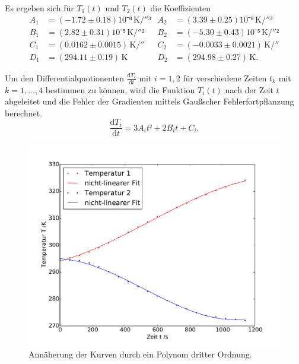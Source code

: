 Es ergeben sich für $T_1(t)$ und $T_2(t)$ die Koeffizienten 
\begin{align}
	A_1&=(-1.72\pm0.18)10⁻⁸\,\si{\kelvin\per{\second}³}  & A_2&=(3.39\pm0.25)10⁻⁸\,\si{\kelvin\per{\second}³}\\
	B_1&=(2.82\pm0.31)10⁻⁵\,\si{\kelvin\per{\second}²}  & B_2&=(-5.30\pm0.43)10⁻⁵\,\si{\kelvin\per{\second}²}\\
	C_1&=(0.0162\pm0.0015)\,\si{\kelvin\per{\second}}  & C_2&=(-0.0033\pm0.0021)\,\si{\kelvin\per{\second}}\\
	D_1&=(294.11\pm0.19)\,\si{\kelvin}  & D_2&=(294.98\pm0.27)\,\si{\kelvin}.
\end{align}

Um den Differentialquotionenten $\frac{\mathup{d}T_i}{\mathup{d}t}$ mit $i=1,2$ für verschiedene Zeiten $t_k$ mit \\
$k= 1,...,4$ bestimmen zu können, wird die Funktion $T_i(t)$ nach der Zeit $t$ abgeleitet und die Fehler der Gradienten mittels Gaußscher Fehlerfortpflanzung berechnet.
\begin{equation}
	\frac{\mathup{d}T_i}{\mathup{d}t}= 3A_it²+2B_it+C_i.
	\label{ableitung}
\end{equation}
\begin{figure}
	\includegraphics[width=\textwidth]{Bilder/Temperaturfit.pdf}
	\caption{Annäherung der Kurven durch ein Polynom dritter Ordnung.}
\end{figure}

